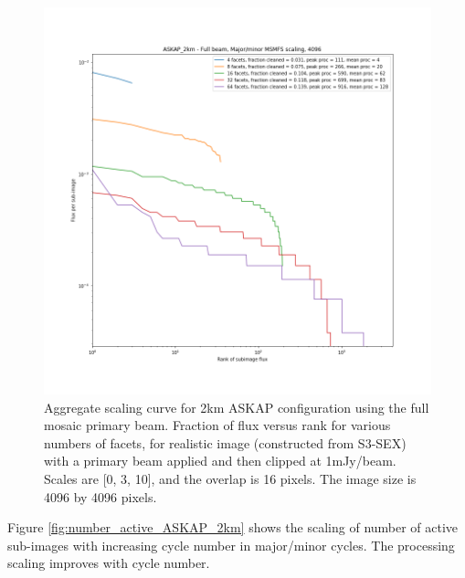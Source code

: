 \documentclass[11pt,a4paper,variablewidth]{article}
\begin{document}
\begin{figure}[H]
  \centering
  \includegraphics[width=\textwidth]{./pngs/full_askap_aggregate_scaling_ASKAP_2km_4096.png}
  \caption{Aggregate scaling curve for 2km ASKAP configuration using the full mosaic primary beam. Fraction of flux versus rank for various numbers of facets, for realistic image (constructed from S3-SEX) with a primary beam applied and then clipped at 1mJy/beam. Scales are [0, 3, 10], and the overlap is 16 pixels. The image size is 4096 by 4096 pixels.}
  \label{fig:full_askap_aggregate_scaling_2km}
\end{figure}

Figure \ref{fig:number_active_ASKAP_2km} shows the scaling of number of active sub-images with increasing cycle number in major/minor cycles. The processing scaling improves with cycle number.
\end{document}
